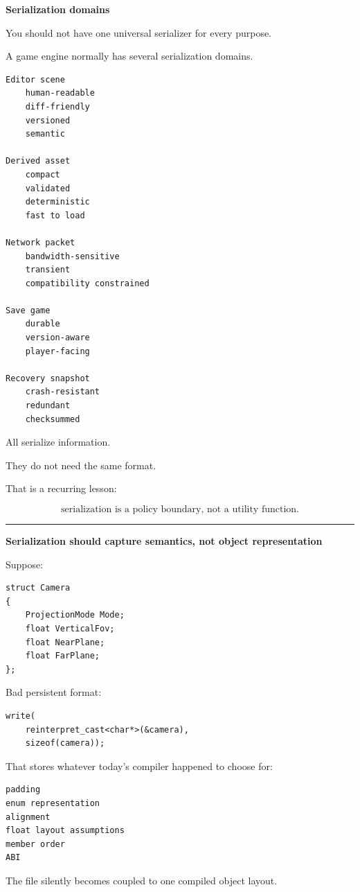 \textbf{Serialization domains}

You should not have one universal serializer for every purpose.

A game engine normally has several serialization domains.

\begin{verbatim}
Editor scene
    human-readable
    diff-friendly
    versioned
    semantic

Derived asset
    compact
    validated
    deterministic
    fast to load

Network packet
    bandwidth-sensitive
    transient
    compatibility constrained

Save game
    durable
    version-aware
    player-facing

Recovery snapshot
    crash-resistant
    redundant
    checksummed
\end{verbatim}

All serialize information.

They do not need the same format.

That is a recurring lesson:

\[
\boxed{
\text{serialization is a policy boundary, not a utility function.}
}
\]

\begin{center}\rule{0.5\linewidth}{0.5pt}\end{center}

\textbf{Serialization should capture semantics, not object representation}

Suppose:

\begin{verbatim}
struct Camera
{
    ProjectionMode Mode;
    float VerticalFov;
    float NearPlane;
    float FarPlane;
};
\end{verbatim}

Bad persistent format:

\begin{verbatim}
write(
    reinterpret_cast<char*>(&camera),
    sizeof(camera));
\end{verbatim}

That stores whatever today's compiler happened to choose for:

\begin{verbatim}
padding
enum representation
alignment
float layout assumptions
member order
ABI
\end{verbatim}

The file silently becomes coupled to one compiled object layout.

